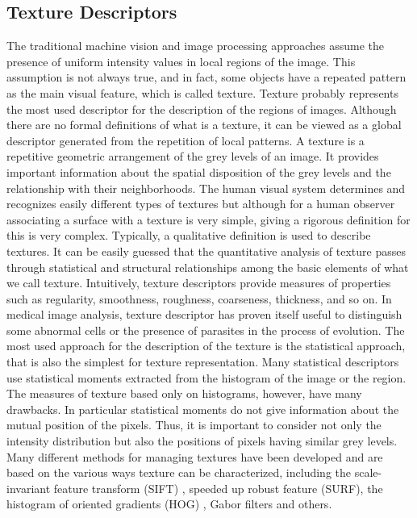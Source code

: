 \documentclass[final,a4paper,12pt,english]{UnicaPhdThesis3}
\begin{document}
\subsection{Texture Descriptors} %
The traditional machine vision and image processing approaches assume the presence of uniform intensity values in local regions of the image. This assumption is not always true, and in fact, some objects have a repeated pattern as the main visual feature, which is called texture. Texture probably represents the most used descriptor for the description of the regions of images. Although there are no formal definitions of what is a texture, it can be viewed as a global descriptor generated from the repetition of local patterns. A texture is a repetitive geometric arrangement of the grey levels of an image. It provides important information about the spatial disposition of the grey levels and the relationship with their neighborhoods. The human visual system determines and recognizes easily different types of textures but although for a human observer associating a surface with a texture is very simple, giving a rigorous definition for this is very complex. Typically, a qualitative definition is used to describe textures. It can be easily guessed that the quantitative analysis of texture passes through statistical and structural relationships among the basic elements of what we call texture. Intuitively, texture descriptors provide measures of properties such as regularity, smoothness, roughness, coarseness, thickness, and so on. In medical image analysis, texture descriptor has proven itself useful to distinguish some abnormal cells or the presence of parasites in the process of evolution. The most used approach for the description of the texture is the statistical approach, that is also the simplest for texture representation. Many statistical descriptors use statistical moments extracted from the histogram of the image or the region. The measures of texture based only on histograms, however, have many drawbacks. In particular statistical moments do not give information about the mutual position of the pixels. Thus, it is important to consider not only the intensity distribution but also the positions of pixels having similar grey levels. Many different methods for managing textures have been developed and are based on the various ways texture can be characterized, including the scale-invariant feature transform (SIFT) \cite{Lowe}, speeded up robust feature (SURF)\cite{Bay}, the histogram of oriented gradients (HOG) \cite{Dalal}, Gabor filters \cite{Jain} and others.
\end{document}
